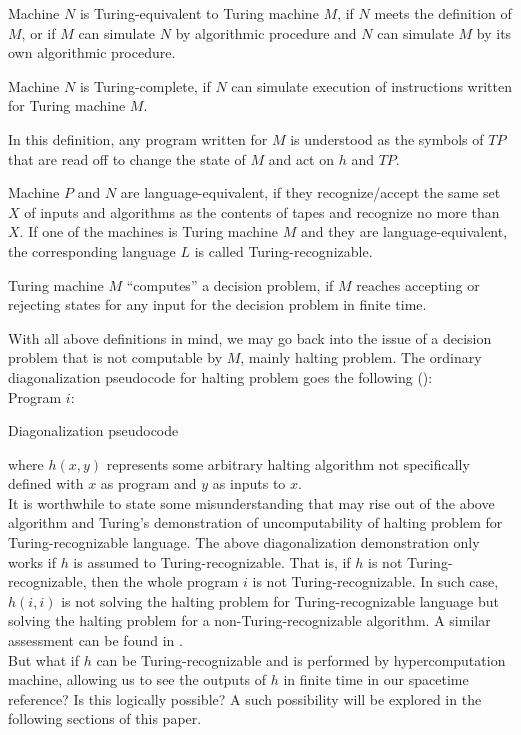 \documentclass{roffin}
\begin{document}
\begin{definition}
Machine $N$ is Turing-equivalent to Turing machine $M$, if $N$ meets the definition of $M$, or if $M$ can simulate $N$ by algorithmic procedure and $N$ can simulate $M$ by its own algorithmic procedure.
\end{definition}
\begin{definition}
Machine $N$ is Turing-complete, if $N$ can simulate execution of instructions written for Turing machine $M$.
\end{definition}
In this definition, any program written for $M$ is understood as the symbols of $TP$ that are read off to change the state of $M$ and act on $h$ and $TP$.
\begin{definition}
Machine $P$ and $N$ are language-equivalent, if they recognize/accept the same set $X$ of inputs and algorithms as the contents of tapes and recognize no more than $X$. If one of the machines is Turing machine $M$ and they are language-equivalent, the corresponding language $L$ is called Turing-recognizable. 
\end{definition}
\begin{definition}
Turing machine $M$ ``computes'' a decision problem, if $M$ reaches accepting or rejecting states for any input for the decision problem in finite time.
\end{definition}
With all above definitions in mind, we may go back into the issue of a decision problem that is not computable by $M$, mainly halting problem. The ordinary diagonalization pseudocode for halting problem goes the following (\cite{penrose90}):\\

Program $i$:\\
\begin{algorithm}[H]
 \caption{Diagonalization pseudocode}
\end{algorithm}
where $h(x,y)$ represents some arbitrary halting algorithm not specifically defined with $x$ as program and $y$ as inputs to $x$.\\
It is worthwhile to state some misunderstanding that may rise out of the above algorithm and Turing's demonstration of uncomputability of halting problem for Turing-recognizable language. The above diagonalization demonstration only works if $h$ is assumed to Turing-recognizable. That is, if $h$ is not Turing-recognizable, then the whole program $i$ is not Turing-recognizable. In such case, $h(i,i)$ is not solving the halting problem for Turing-recognizable language but solving the halting problem for a non-Turing-recognizable algorithm. A similar assessment can be found in \cite{ord05}.\\
But what if $h$ can be Turing-recognizable and is performed by hypercomputation machine, allowing us to see the outputs of $h$ in finite time in our spacetime reference? Is this logically possible? A such possibility will be explored in the following sections of this paper.
\end{document}
